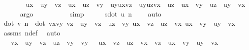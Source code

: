\begin{isabellebody}
\ \ \isamarkupfalse%
\ \isamarkupfalse%
\ {\isachardoublequoteopen}{\isachardot}{\kern0pt}{\isachardot}{\kern0pt}{\isachardot}{\kern0pt}\ {\isacharequal}{\kern0pt}\ ux\ {\isacharasterisk}{\kern0pt}\ uy\ {\isacharasterisk}{\kern0pt}\ vz\ {\isacharminus}{\kern0pt}\ ux\ {\isacharasterisk}{\kern0pt}\ uz\ {\isacharasterisk}{\kern0pt}\ vy\ {\isacharminus}{\kern0pt}\ uy{\isacharasterisk}{\kern0pt}ux{\isacharasterisk}{\kern0pt}vz\ {\isacharplus}{\kern0pt}\ uy{\isacharasterisk}{\kern0pt}uz{\isacharasterisk}{\kern0pt}vx\ {\isacharplus}{\kern0pt}\ uz\ {\isacharasterisk}{\kern0pt}\ ux\ {\isacharasterisk}{\kern0pt}\ vy\ {\isacharminus}{\kern0pt}\ uz\ {\isacharasterisk}{\kern0pt}\ uy\ {\isacharasterisk}{\kern0pt}\ vx{\isachardoublequoteclose}\isanewline
\ \ \ \ \isamarkupfalse%
\ argo\isanewline
\ \ \isamarkupfalse%
\ \isamarkupfalse%
\ {\isachardoublequoteopen}{\isachardot}{\kern0pt}{\isachardot}{\kern0pt}{\isachardot}{\kern0pt}\ {\isacharequal}{\kern0pt}\ {}{\isachardoublequoteclose}\ \isamarkupfalse%
\ simp\isanewline
\ \ \isamarkupfalse%
\ \isamarkupfalse%
\ s{\isacharcolon}{\kern0pt}{\isachardoublequoteopen}dot\ u\ n\ {\isacharequal}{\kern0pt}\ {}{\isachardoublequoteclose}\ \isamarkupfalse%
\ auto\isanewline
\isanewline
\ \ \isamarkupfalse%
\ {\isachardoublequoteopen}dot\ v\ n\ {\isacharequal}{\kern0pt}\ dot\ {\isacharparenleft}{\kern0pt}vx{\isacharcomma}{\kern0pt}vy{\isacharcomma}{\kern0pt}\ vz{\isacharparenright}{\kern0pt}\ \ {\isacharparenleft}{\kern0pt}uy\ {\isacharasterisk}{\kern0pt}\ vz\ {\isacharminus}{\kern0pt}\ uz\ {\isacharasterisk}{\kern0pt}\ vy{\isacharcomma}{\kern0pt}\ {\isacharminus}{\kern0pt}ux\ {\isacharasterisk}{\kern0pt}\ vz\ {\isacharplus}{\kern0pt}\ uz\ {\isacharasterisk}{\kern0pt}\ vx{\isacharcomma}{\kern0pt}\ ux\ {\isacharasterisk}{\kern0pt}\ vy\ {\isacharminus}{\kern0pt}\ uy\ {\isacharasterisk}{\kern0pt}\ vx{\isacharparenright}{\kern0pt}{\isachardoublequoteclose}\ \isamarkupfalse%
\ assms\ ndef\ \isamarkupfalse%
\ auto\isanewline
\ \ \isamarkupfalse%
\ \isamarkupfalse%
\ {\isachardoublequoteopen}{\isachardot}{\kern0pt}{\isachardot}{\kern0pt}{\isachardot}{\kern0pt}\ {\isacharequal}{\kern0pt}\ vx\ {\isacharasterisk}{\kern0pt}\ {\isacharparenleft}{\kern0pt}uy\ {\isacharasterisk}{\kern0pt}\ vz\ {\isacharminus}{\kern0pt}\ uz\ {\isacharasterisk}{\kern0pt}\ vy{\isacharparenright}{\kern0pt}\ {\isacharplus}{\kern0pt}\ vy\ {\isacharasterisk}{\kern0pt}\ {\isacharparenleft}{\kern0pt}\ {\isacharminus}{\kern0pt}ux\ {\isacharasterisk}{\kern0pt}\ vz\ {\isacharplus}{\kern0pt}\ uz\ {\isacharasterisk}{\kern0pt}\ vx{\isacharparenright}{\kern0pt}\ {\isacharplus}{\kern0pt}\ vz\ {\isacharasterisk}{\kern0pt}\ {\isacharparenleft}{\kern0pt}ux\ {\isacharasterisk}{\kern0pt}\ vy\ {\isacharminus}{\kern0pt}\ uy\ {\isacharasterisk}{\kern0pt}\ vx{\isacharparenright}{\kern0pt}{\isachardoublequoteclose}\ \isanewline

\end{isabellebody}

